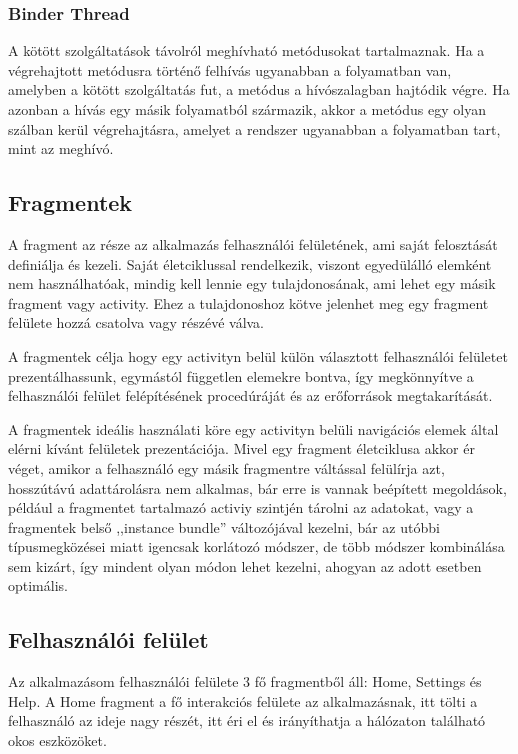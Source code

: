 \documentclass[
]{thesis-ekf}
\theoremstyle{definition}
\theoremstyle{remark}
\begin{document}
\subsubsection{Binder Thread}
A kötött szolgáltatások távolról meghívható metódusokat tartalmaznak. Ha a végrehajtott metódusra történő felhívás ugyanabban a folyamatban van, amelyben a kötött szolgáltatás fut, a metódus a hívószalagban hajtódik végre. Ha azonban a hívás egy másik folyamatból származik, akkor a metódus egy olyan szálban kerül végrehajtásra, amelyet a rendszer ugyanabban a folyamatban tart, mint az meghívó.

\subsection{Fragmentek}
A fragment az része az alkalmazás felhasználói felületének, ami saját felosztását definiálja és kezeli. Saját életciklussal
rendelkezik, viszont egyedülálló elemként nem használhatóak, mindig kell lennie egy tulajdonosának, ami lehet egy másik
fragment vagy activity. Ehez a tulajdonoshoz kötve jelenhet meg egy fragment felülete hozzá csatolva vagy részévé válva.

A fragmentek célja hogy egy activityn belül külön választott felhasználói felületet prezentálhassunk, egymástól független
elemekre bontva, így megkönnyítve a felhasználói felület felépítésének procedúráját és az erőforrások megtakarítását.

A fragmentek ideális használati köre egy activityn belüli navigációs elemek által elérni kívánt felületek prezentációja. Mivel egy fragment életciklusa akkor ér véget, amikor a felhasználó egy másik fragmentre váltással felülírja azt, hosszútávú
adattárolásra nem alkalmas, bár erre is vannak beépített megoldások, például a fragmentet tartalmazó activiy szintjén tárolni
az adatokat, vagy a fragmentek belső ,,instance bundle'' változójával kezelni, bár az utóbbi típusmegközései miatt igencsak
korlátozó módszer, de több módszer kombinálása sem kizárt, így mindent olyan módon lehet kezelni, ahogyan az adott esetben optimális.
\subsection{Felhasználói felület}
Az alkalmazásom felhasználói felülete 3 fő fragmentből áll: Home, Settings és Help. A Home fragment a fő interakciós felülete
az alkalmazásnak, itt tölti a felhasználó az ideje nagy részét, itt éri el és irányíthatja a hálózaton található okos eszközöket.
\end{document}
